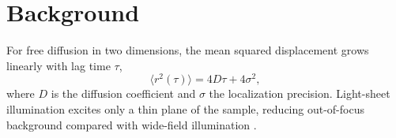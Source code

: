 \chapter{Background}
\label{ch:background}

For free diffusion in two dimensions, the mean squared displacement grows linearly with lag
time $\tau$,
\begin{equation}
  \langle r^2(\tau) \rangle = 4 D \tau + 4\sigma^2 ,
  \label{eq:msd}
\end{equation}
where $D$ is the diffusion coefficient and $\sigma$ the localization precision. Light-sheet
illumination excites only a thin plane of the sample, reducing out-of-focus background compared
with wide-field illumination \citep{huisken2004}.
